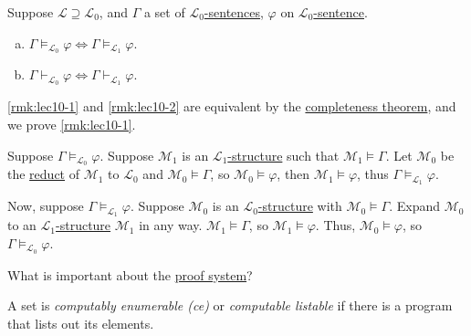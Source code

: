 \begin{remark}
	Suppose \(\mathcal{L} \supseteq \mathcal{L} _0\), and \(\Gamma \) a set of \hyperref[def:sentence]{\(\mathcal{L} _0\)-sentences}, \(\varphi \) on \hyperref[def:sentence]{\(\mathcal{L} _0\)-sentence}.
	\begin{enumerate}[(a)]
		\item\label{rmk:lec10-1} \(\Gamma \models _{\mathcal{L} _0} \varphi \iff \Gamma \models _{\mathcal{L} _1} \varphi \).
		\item\label{rmk:lec10-2} \(\Gamma \vdash _{\mathcal{L} _0} \varphi \iff \Gamma \vdash _{\mathcal{L} _1} \varphi \).
	\end{enumerate}
\end{remark}
\begin{explanation}
	\autoref{rmk:lec10-1} and \autoref{rmk:lec10-2} are equivalent by the \hyperref[thm:completeness]{completeness theorem}, and we prove \autoref{rmk:lec10-1}.

	Suppose \(\Gamma \models _{\mathcal{L} _0} \varphi \). Suppose \(\mathcal{M} _1\) is an \hyperref[def:structure]{\(\mathcal{L} _1\)-structure} such that \(\mathcal{M} _1 \models \Gamma \). Let \(\mathcal{M} _0\) be the \hyperref[not:reduct]{reduct} of \(\mathcal{M} _1\) to \(\mathcal{L} _0\)  and \(\mathcal{M} _0 \models \Gamma \), so \(\mathcal{M} _0 \models \varphi \), then \(\mathcal{M} _1 \models \varphi \), thus \(\Gamma \models _{\mathcal{L} _1} \varphi \).

	Now, suppose \(\Gamma \models _{\mathcal{L} _1} \varphi \). Suppose \(\mathcal{M} _0\) is an \hyperref[def:structure]{\(\mathcal{L} _0\)-structure} with \(\mathcal{M} _0 \models \Gamma \). Expand \(\mathcal{M} _0\) to an \hyperref[def:structure]{\(\mathcal{L} _1\)-structure} \(\mathcal{M} _1\) in any way. \(\mathcal{M} _1 \models \Gamma \), so \(\mathcal{M} _1 \models \varphi \). Thus, \(\mathcal{M} _0 \models \varphi \), so \(\Gamma \models _{\mathcal{L} _0} \varphi \).
\end{explanation}

What is important about the \hyperref[def:proof]{proof system}?

\begin{definition}\label{def:computably-enumerable}
	A set is \emph{computably enumerable (ce)} or \emph{computable listable} if there is a program that lists out its elements.
\end{definition}

